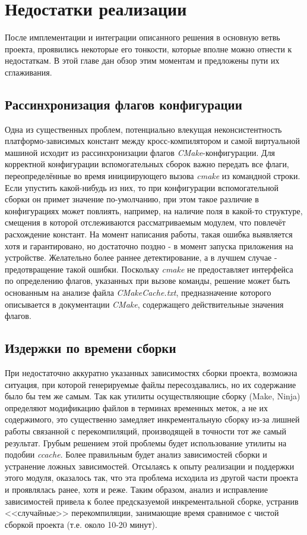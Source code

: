 \chapter{Недостатки реализации}
\label{sec:Chapter4} 

После имплементации и интеграции описанного решения в основную ветвь проекта, проявились некоторые его тонкости, которые вполне можно отнести к недостаткам. В этой главе дан обзор этим моментам и предложены пути их сглаживания.

\section{Рассинхронизация флагов конфигурации}
Одна из существенных проблем, потенциально влекущая неконсистентность платформо-зависимых констант между кросс-компилятором и самой виртуальной машиной исходит из рассинхронизации флагов \textit{CMake}-конфигурации.
Для корректной конфигурации вспомогательных сборок важно передать все флаги, переопределённые во время инициирующего вызова \textit{cmake} из командной строки.
Если упустить какой-нибудь из них, то при конфигурации вспомогательной сборки он примет значение по-умолчанию, при этом такое различие в конфигурациях может повлиять, например, на наличие поля в какой-то структуре, смещения в которой отслеживаются рассматриваемым модулем, что повлечёт расхождение констант.
На момент написания работы, такая ошибка выявляется хотя и гарантировано, но достаточно поздно - в момент запуска приложения на устройстве.
Желательно более раннее детектирование, а в лучшем случае - предотвращение такой ошибки.
Поскольку \textit{cmake} не предоставляет интерфейса по определению флагов, указанных при вызове команды, решение может быть основанным на анализе файла \textit{CMakeCache.txt}, предназначение которого описывается в документации \textit{CMake}, содержащего действительные значения флагов. 

\section{Издержки по времени сборки}
При недостаточно аккуратно указанных зависимостях сборки проекта, возможна ситуация, при которой генерируемые файлы пересоздавались, но их содержание было бы тем же самым. Так как утилиты осуществляющие сборку (Make, Ninja) определяют модификацию файлов в терминах временных меток, а не их содержимого, это существенно замедляет инкрементальную сборку из-за лишней работы связанной с перекомпиляций, производящей в точности тот же самый результат.
Грубым решением этой проблемы будет использование утилиты на подобии \textit{ccache}.
Более правильным будет анализ зависимостей сборки и устранение ложных зависимостей.
Отсылаясь к опыту реализации и поддержки этого модуля, оказалось так, что эта проблема исходила из другой части проекта и проявлялась ранее, хотя и реже. Таким образом, анализ и исправление зависимостей привела к более предсказуемой инкрементальной сборке, устранив <<случайные>> перекомпиляции, занимающие время сравнимое с чистой сборкой проекта (т.е. около 10-20 минут).

